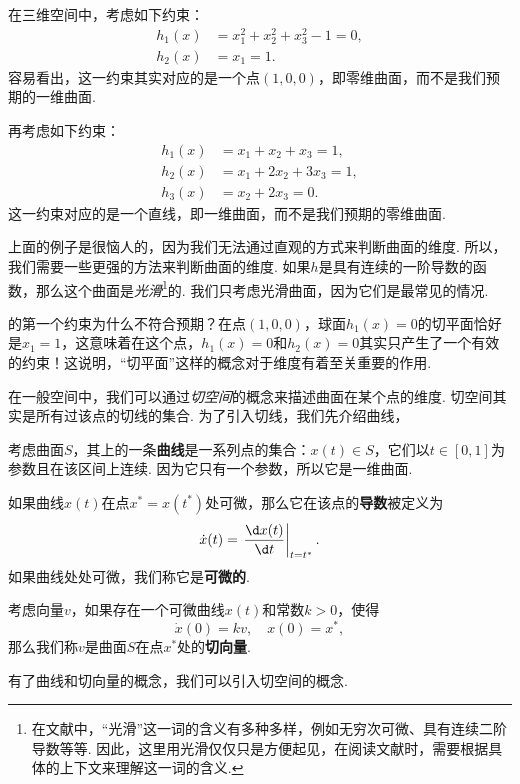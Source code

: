 \begin{example}\label{ex:3d-constraint-2}
在三维空间中，考虑如下约束：
\begin{align*}
    h_1(x)&=x_1^2+x_2^2+x_3^2-1=0,\\
    h_2(x)&=x_1=1.
\end{align*}
容易看出，这一约束其实对应的是一个点$(1,0,0)$，即零维曲面，而不是我们预期的一维曲面.

再考虑如下约束：
\begin{align*}
    h_1(x)&=x_1+x_2+x_3=1,\\
    h_2(x)&=x_1+2x_2+3x_3=1,\\
    h_3(x)&=x_2+2x_3=0.
\end{align*}
这一约束对应的是一个直线，即一维曲面，而不是我们预期的零维曲面.
\end{example}

上面的例子是很恼人的，因为我们无法通过直观的方式来判断曲面的维度. 所以，我们需要一些更强的方法来判断曲面的维度. 如果$h$是具有连续的一阶导数的函数，那么这个曲面是\emph{光滑}\footnote{在文献中，“光滑”这一词的含义有多种多样，例如无穷次可微、具有连续二阶导数等等. 因此，这里用光滑仅仅只是方便起见，在阅读文献时，需要根据具体的上下文来理解这一词的含义.}的. 我们只考虑光滑曲面，因为它们是最常见的情况.

 的第一个约束为什么不符合预期？在点$(1,0,0)$，球面$h_1(x)=0$的切平面恰好是$x_1=1$，这意味着在这个点，$h_1(x)=0$和$h_2(x)=0$其实只产生了一个有效的约束！这说明，“切平面”这样的概念对于维度有着至关重要的作用. 
    
在一般空间中，我们可以通过\emph{切空间}的概念来描述曲面在某个点的维度. 切空间其实是所有过该点的切线的集合. 为了引入切线，我们先介绍曲线，
\begin{definition}[曲线和切向量]
    考虑曲面$S$，其上的一条\textbf{曲线}是一系列点的集合：$x(t)\in S$，它们以$t\in[0,1]$为参数且在该区间上连续. 因为它只有一个参数，所以它是一维曲面. 

    如果曲线$x(t)$在点$x^*=x(t^*)$处可微，那么它在该点的\textbf{导数}被定义为
    \[\dot{x}(t)=\left.\frac{\d x(t)}{\d t}\right|_{t=t^*}.\]
    如果曲线处处可微，我们称它是\textbf{可微的}. 

    考虑向量$v$，如果存在一个可微曲线$x(t)$和常数$k>0$，使得
    \[\dot{x}(0)=kv,\quad x(0)=x^*,\]
    那么我们称$v$是曲面$S$在点$x^*$处的\textbf{切向量}.
\end{definition}

有了曲线和切向量的概念，我们可以引入切空间的概念. 

